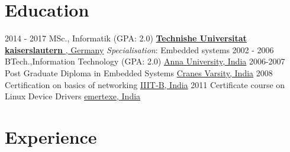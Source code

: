 \documentclass[letterpaper]{twentysecondcv} %
\begin{document}
\makeprofile %

\section{Education}

\begin{twenty} %
	\twentyitem
    	{2014 - 2017}
        {}
        {MSc., Informatik \textnormal{(GPA: 2.0)}}
        {\href{http://www.uni-kl.de/en/home/}{\textcolor{materialindigo}{\textbf{Technishe Universitat kaiserslautern} , Germany}} }
       {{\textit{{Specialisation}}}: Embedded systems}
        {}
	\twentyitem
    	{2002 - 2006}
		{}
        {BTech.,Information Technology  \textnormal{(GPA: 2.0)}}
        {\href{https://www.annauniv.edu//}{\textcolor{materialindigo}{Anna University, India}}}
        {}
        {}
     \twentyitem
        {2006-2007}
        {}
        {Post Graduate Diploma in Embedded Systems}
        {\href{http://www.cranesvarsity.com/}{\textcolor{materialindigo}{Cranes Varsity, India}}}
        {}
        {}
      \twentyitem
        {2008}
        {}
        {Certification on basics of networking}
        {\href{https://www.iiitb.ac.in/}{\textcolor{materialindigo}{IIIT-B, India}}}
        {}
        {}
      \twentyitem
        {2011}
        {}
        {Certificate course on Linux Device Drivers}
        {\href{http://www.emertxe.com/}{\textcolor{materialindigo}{emertexe, India}}}
        {}
        {}
\end{twenty}
\vspace{3mm}
\section{Experience} 
\end{document}
